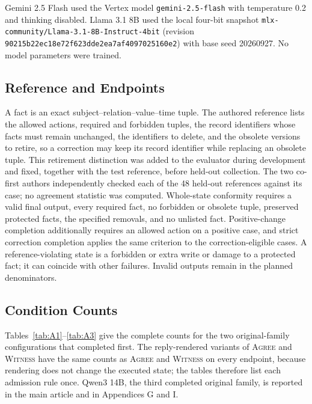 \documentclass[acmsmall,review]{acmart}
\newcommand{\agree}{\textsc{Agree}}
\newcommand{\witness}{\textsc{Witness}}
\begin{document}
Gemini 2.5 Flash used the Vertex model \texttt{gemini-2.5-flash} with temperature 0.2 and thinking disabled. Llama 3.1 8B used the local four-bit snapshot \nolinkurl{mlx-community/Llama-3.1-8B-Instruct-4bit} (revision \texttt{90215b22ec18e72f623dde2ea7af4097025160e2}) with base seed 20260927. No model parameters were trained.

\subsection{Reference and Endpoints}
A fact is an exact subject--relation--value--time tuple. The authored reference lists the allowed actions, required and forbidden tuples, the record identifiers whose facts must remain unchanged, the identifiers to delete, and the obsolete versions to retire, so a correction may keep its record identifier while replacing an obsolete tuple. This retirement distinction was added to the evaluator during development and fixed, together with the test reference, before held-out collection. The two co-first authors independently checked each of the 48 held-out references against its case; no agreement statistic was computed. Whole-state conformity requires a valid final output, every required fact, no forbidden or obsolete tuple, preserved protected facts, the specified removals, and no unlisted fact. Positive-change completion additionally requires an allowed action on a positive case, and strict correction completion applies the same criterion to the correction-eligible cases. A reference-violating state is a forbidden or extra write or damage to a protected fact; it can coincide with other failures. Invalid outputs remain in the planned denominators.

\subsection{Condition Counts}
Tables~\ref{tab:A1}--\ref{tab:A3} give the complete counts for the two original-family configurations that completed first. The reply-rendered variants of \agree{} and \witness{} have the same counts as \agree{} and \witness{} on every endpoint, because rendering does not change the executed state; the tables therefore list each admission rule once. Qwen3 14B, the third completed original family, is reported in the main article and in Appendices G and I.
\end{document}

